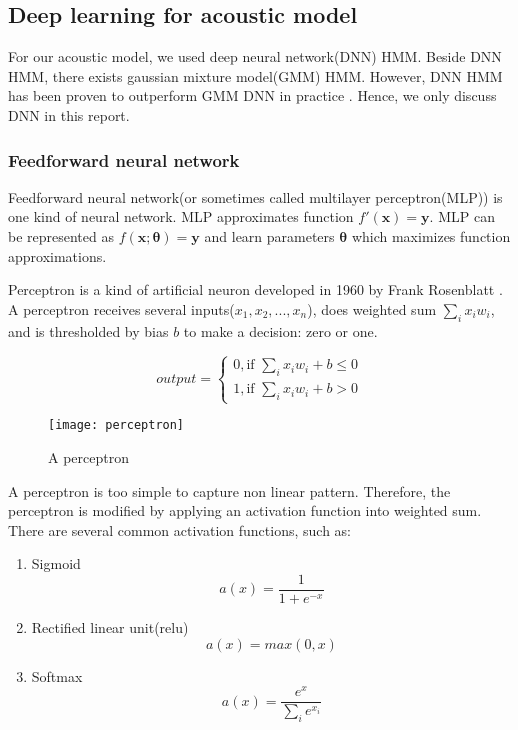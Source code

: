 \subsection{Deep learning for acoustic model}
For our acoustic model, we used deep neural network(DNN) HMM. Beside DNN HMM, there exists gaussian mixture model(GMM) HMM. However, DNN HMM has been proven to outperform GMM DNN in practice \cite{Peddinti2015ATD}. Hence, we only discuss DNN in this report.

\subsubsection{Feedforward neural network}
Feedforward neural network(or sometimes called multilayer perceptron(MLP)) is one kind of neural network. MLP approximates function $f'(\mathbf{x})=\mathbf{y}$. MLP can be represented as $f(\mathbf{x};\mathbf{\theta})=\mathbf{y}$ and learn parameters $\mathbf{\theta}$ which maximizes function approximations. 

Perceptron is a kind of artificial neuron developed in 1960 by Frank Rosenblatt \cite{Rosenblatt1960}. A perceptron receives several inputs($x_{1}, x_{2}, ..., x_{n}$), does weighted sum $\sum_{i} x_{i}w_{i}$, and is thresholded by bias $b$ to make a decision: zero or one.
 
\begin{equation}
output = 
\begin{cases}
0 , \textrm{if } \sum_{i} x_{i}w_{i} + b \leq 0 \\
1, \textrm{if } \sum_{i} x_{i}w_{i} + b > 0
\end{cases}
\end{equation}

\begin{figure}
\label{tdnnArchitecture}
\caption{A perceptron}
\texttt{[image: perceptron]}
\centering
\end{figure}

A perceptron is too simple to capture non linear pattern. Therefore, the perceptron is modified by applying an activation function into weighted sum. There are several common activation functions, such as: 
\begin{enumerate}
\item Sigmoid
\begin{equation}
a(x) = \frac{1}{1 + e ^{-x}}
\end{equation} 

\item Rectified linear unit(relu)
\begin{equation}
a(x) = max(0,x)
\end{equation} 


\item Softmax
\begin{equation}
a(x) = \frac{e^{x}}{\sum_{i} e^{x_{i}}}
\end{equation} 

\end{enumerate}

